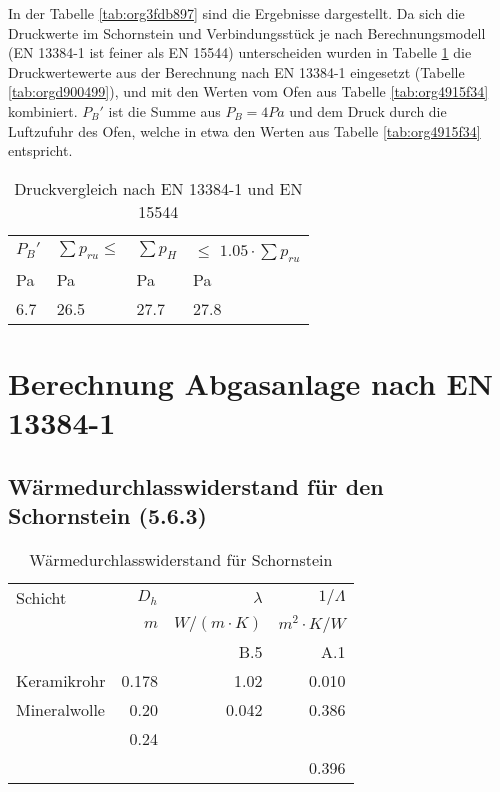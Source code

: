 \documentclass[a4paper,10pt,twoside]{article}
\begin{document}
In der Tabelle \ref{tab:org3fdb897} sind die Ergebnisse dargestellt.
Da sich die Druckwerte im Schornstein und Verbindungsstück je nach Berechnungsmodell (EN 13384-1 ist feiner als EN 15544) 
unterscheiden wurden in Tabelle \ref{tab:org0046b73} die Druckwertewerte aus der Berechnung nach EN 13384-1 eingesetzt (Tabelle \ref{tab:orgd900499}),
und mit den Werten vom Ofen aus Tabelle \ref{tab:org4915f34}  kombiniert. \(P_B'\) ist die Summe aus \(P_B=4Pa\) und dem Druck durch die Luftzufuhr
des Ofen, welche in etwa den Werten aus Tabelle \ref{tab:org4915f34} entspricht.

\begin{table}[htbp]
\caption{\label{tab:org0046b73}
Druckvergleich nach EN 13384-1 und EN 15544}
\centering
\begin{tabular}{llll}
\(P_B'\) & \(\sum p_{ru} \le\) & \(\sum p_H\) & \(\le\) \(1.05 \cdot \sum p_{ru}\)\\
Pa & Pa & Pa & Pa\\
\hline
6.7 & 26.5 & 27.7 & 27.8\\
\end{tabular}
\end{table}



\section{Berechnung Abgasanlage nach EN 13384-1 \cite{EN13384}}
\label{sec:orgd0fad99}
\label{org2e44690}
\subsection{Wärmedurchlasswiderstand für den Schornstein (5.6.3)}
\label{sec:org0b7a994}
\begin{table}[htbp]
\caption{Wärmedurchlasswiderstand für Schornstein}
\centering
\begin{tabular}{lrrr}
Schicht & \(D_h\) & \(\lambda\) & \(1/\Lambda\)\\
 & \(m\) & \(W/(m\cdot K)\) & \(m^2\cdot K/W\)\\
 &  & B.5 & A.1\\
\hline
Keramikrohr & 0.178 & 1.02 & 0.010\\
Mineralwolle & 0.20 & 0.042 & 0.386\\
 & 0.24 &  & \\
 &  &  & 0.396\\
\end{tabular}
\end{table}
\end{document}
